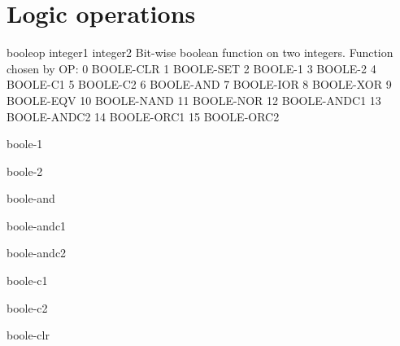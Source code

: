 \section{Logic operations}
\label{sec:logic-operations}

\begin{function}{boole}{op integer1 integer2}{}{}
  Bit-wise boolean function on two integers. Function chosen by OP:
        0       BOOLE-CLR
        1       BOOLE-SET
        2       BOOLE-1
        3       BOOLE-2
        4       BOOLE-C1
        5       BOOLE-C2
        6       BOOLE-AND
        7       BOOLE-IOR
        8       BOOLE-XOR
        9       BOOLE-EQV
        10      BOOLE-NAND
        11      BOOLE-NOR
        12      BOOLE-ANDC1
        13      BOOLE-ANDC2
        14      BOOLE-ORC1
        15      BOOLE-ORC2
\end{function}

\begin{constant}{boole-1}{}{}{}
  
\end{constant}

\begin{constant}{boole-2}{}{}{}
  
\end{constant}

\begin{constant}{boole-and}{}{}{}
  
\end{constant}

\begin{constant}{boole-andc1}{}{}{}
  
\end{constant}

\begin{constant}{boole-andc2}{}{}{}
  
\end{constant}

\begin{constant}{boole-c1}{}{}{}
  
\end{constant}

\begin{constant}{boole-c2}{}{}{}
  
\end{constant}

\begin{constant}{boole-clr}{}{}{}
  
\end{constant}

